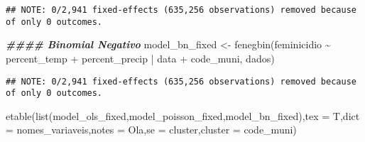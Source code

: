 \documentclass[
]{article}
\newenvironment{Shaded}{\begin{snugshade}}{\end{snugshade}}
\newcommand{\AttributeTok}[1]{\textcolor[rgb]{0.77,0.63,0.00}{#1}}
\newcommand{\DocumentationTok}[1]{\textcolor[rgb]{0.56,0.35,0.01}{\textbf{\textit{#1}}}}
\newcommand{\FunctionTok}[1]{\textcolor[rgb]{0.00,0.00,0.00}{#1}}
\newcommand{\NormalTok}[1]{#1}
\newcommand{\OtherTok}[1]{\textcolor[rgb]{0.56,0.35,0.01}{#1}}
\newcommand{\SpecialCharTok}[1]{\textcolor[rgb]{0.00,0.00,0.00}{#1}}
\newcommand{\StringTok}[1]{\textcolor[rgb]{0.31,0.60,0.02}{#1}}
\begin{document}
\begin{verbatim}
## NOTE: 0/2,941 fixed-effects (635,256 observations) removed because of only 0 outcomes.
\end{verbatim}

\begin{Shaded}
\begin{Highlighting}[]
\DocumentationTok{\#\#\#\# Binomial Negativo}
\NormalTok{model\_bn\_fixed }\OtherTok{\textless{}{-}} \FunctionTok{fenegbin}\NormalTok{(feminicidio  }\SpecialCharTok{\textasciitilde{}}\NormalTok{ percent\_temp }\SpecialCharTok{+}\NormalTok{ percent\_precip }\SpecialCharTok{|}\NormalTok{ data }\SpecialCharTok{+}\NormalTok{ code\_muni, dados)}
\end{Highlighting}
\end{Shaded}

\begin{verbatim}
## NOTE: 0/2,941 fixed-effects (635,256 observations) removed because of only 0 outcomes.
\end{verbatim}

\begin{Shaded}
\begin{Highlighting}[]
\FunctionTok{etable}\NormalTok{(}\FunctionTok{list}\NormalTok{(model\_ols\_fixed,model\_poisson\_fixed,model\_bn\_fixed),}\AttributeTok{tex =}\NormalTok{ T,}\AttributeTok{dict =}\NormalTok{ nomes\_variaveis,}\AttributeTok{notes =} \StringTok{\textquotesingle{}Ola\textquotesingle{}}\NormalTok{,}\AttributeTok{se =} \StringTok{\textquotesingle{}cluster\textquotesingle{}}\NormalTok{,}\AttributeTok{cluster =} \StringTok{\textquotesingle{}code\_muni\textquotesingle{}}\NormalTok{)}
\end{Highlighting}
\end{Shaded}
\end{document}
